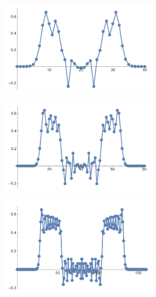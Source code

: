 \documentclass[12pt, a4paper]{article}
\begin{document}
	\begin{figure}[H]
		\centering
		\begin{subfigure}{.5\textwidth}
			\centering
			\includegraphics[width=0.85\textwidth]{test1-01}
		\end{subfigure}%
		\begin{subfigure}{.5\textwidth}
			\centering
			\includegraphics[width=0.85\textwidth]{test1-05}
		\end{subfigure}
		\begin{subfigure}{.5\textwidth}
			\centering
			\includegraphics[width=0.85\textwidth]{test1-075}

\end{subfigure}
\end{figure}
\end{document}
